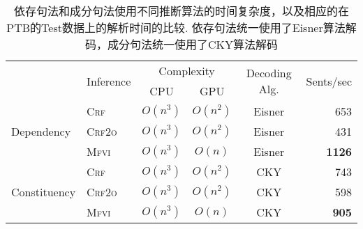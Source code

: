 \begin{table}[tb!]
  \centering
  \caption{依存句法和成分句法使用不同推断算法的时间复杂度，以及相应的在PTB的Test数据上的解析时间的比较.
    依存句法统一使用了Eisner算法解码，成分句法统一使用了CKY算法解码}
  \begin{tabular}{llcccr}
    \toprule
     & \multirow{2}{*}{Inference} & \multicolumn{2}{c}{Complexity} & \multirow{2}{*}{Decoding Alg.} & \multirow{2}{*}{Sents/sec}                 \\
     &                            & CPU                            & GPU                            &                            &               \\[2pt]
    \midrule
    \multirow{3}{*}{Dependency}
     & \textsc{Crf}               & $O(n^3)$                       & $O(n^2)$                       & Eisner                     & 653           \\
     & \textsc{Crf2o}             & $O(n^3)$                       & $O(n^2)$                       & Eisner                     & 431           \\
     & \textsc{Mfvi}              & $O(n^3)$                       & $O(n)$                         & Eisner                     & \textbf{1126} \\
    \midrule
    \multirow{3}{*}{Constituency}
     & \textsc{Crf}               & $O(n^3)$                       & $O(n^2)$                       & CKY                        & 743           \\
     & \textsc{Crf2o}             & $O(n^3)$                       & $O(n^2)$                       & CKY                        & 598           \\
     & \textsc{Mfvi}              & $O(n^3)$                       & $O(n)$                         & CKY                        & \textbf{905}  \\

    \bottomrule
  \end{tabular}
  \label{table:vi-speed}
\end{table}